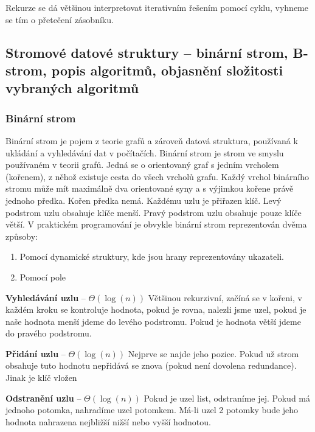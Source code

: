 Rekurze se dá většinou interpretovat iterativním řešením pomocí cyklu, vyhneme se tím o přetečení zásobníku.


\subsection[Stromové datové struktury]{Stromové datové struktury – binární strom, B-strom, popis algoritmů, objasnění složitosti vybraných algoritmů}
\subsubsection{Binární strom}
Binární strom je pojem z teorie grafů a zároveň datová struktura, používaná k ukládání a vyhledávání dat v počítačích. Binární strom je strom ve smyslu používaném v teorii grafů. Jedná se o orientovaný graf s jedním vrcholem (kořenem), z něhož existuje cesta do všech vrcholů grafu. Každý vrchol binárního stromu může mít maximálně dva orientované syny a s výjimkou kořene právě jednoho předka. Kořen předka nemá. Každému uzlu je přiřazen klíč. Levý podstrom uzlu obsahuje klíče menší. Pravý podstrom uzlu obsahuje pouze klíče větší. V praktickém programování je obvykle binární strom reprezentován dvěma způsoby:
\begin{enumerate}
\item Pomocí dynamické struktury, kde jsou hrany reprezentovány ukazateli.
\item Pomocí pole
\end{enumerate}

\textbf{Vyhledávání uzlu} -- $\Theta(\log(n))$ Většinou rekurzivní, začíná se v kořeni, v každém kroku se kontroluje hodnota, pokud je rovna, nalezli jsme uzel, pokud je naše hodnota menší jdeme do levého podstromu. Pokud je hodnota větší jdeme do pravého podstromu.


\textbf{Přidání uzlu} -- $\Theta(\log(n))$ Nejprve se najde jeho pozice. Pokud už strom obsahuje tuto hodnotu nepřidává se znova (pokud není dovolena redundance). Jinak je klíč vložen


\textbf{Odstranění uzlu} -- $\Theta(\log(n))$ Pokud je uzel list, odstraníme jej. Pokud má jednoho potomka, nahradíme uzel potomkem. Má-li uzel 2 potomky bude jeho hodnota nahrazena nejbližší nižší nebo vyšší hodnotou.

